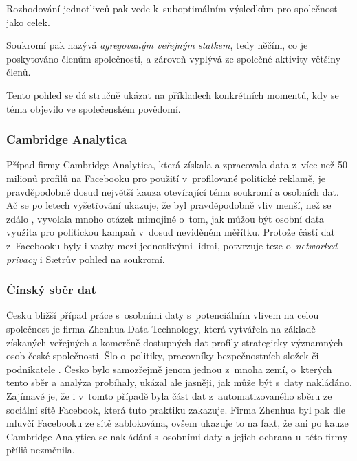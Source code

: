 \begin{displayquote}
	\citep{privacy-as-aggregate-public-good}
\end{displayquote}

Rozhodování jednotlivců pak vede k~suboptimálním výsledkům pro společnost jako celek.

Soukromí pak nazývá \textit{agregovaným veřejným statkem}, tedy něčím, co je poskytováno členům společnosti, a zároveň vyplývá ze společné aktivity většiny členů.

Tento pohled se dá stručně ukázat na příkladech konkrétních momentů, kdy se téma objevilo ve společenském povědomí.

\subsubsection*{Cambridge Analytica}
Případ firmy Cambridge Analytica, která získala a zpracovala data z~více než 50 milionů profilů na Facebooku \citep{cambridge-analytica} pro použití v~profilované politické reklamě, je pravděpodobně dosud největší kauza otevírající téma soukromí a osobních dat. Ač se po letech vyšetřování ukazuje, že byl pravděpodobně vliv menší, než se zdálo \citep{ca-brexit, ca-elections}, vyvolala mnoho otázek mimojiné o~tom, jak můžou být osobní data využita pro politickou kampaň v~dosud neviděném měřítku. Protože částí dat z~Facebooku byly i vazby mezi jednotlivými lidmi, potvrzuje teze o~\textit{networked privacy} i Sætrův pohled na soukromí.

\subsubsection*{Čínský sběr dat}
Česku bližší případ práce s~osobními daty s~potenciálním vlivem na celou společnost je firma Zhenhua Data Technology, která vytvářela na základě získaných veřejných a komerčně dostupných dat profily strategicky významných osob české společnosti. Šlo o~politiky, pracovníky bezpečnostních složek či podnikatele \citep{china-czech}. Česko bylo samozřejmě jenom jednou z~mnoha zemí, o~kterých tento sběr a analýza probíhaly, ukázal ale jasněji, jak může být s~daty nakládáno.
Zajímavé je, že i v~tomto případě byla část dat z~automatizovaného sběru ze sociální sítě Facebook, která tuto praktiku zakazuje. Firma Zhenhua byl pak dle mluvčí Facebooku ze sítě zablokována, ovšem ukazuje to na fakt, že ani po kauze Cambridge Analytica se nakládání s~osobními daty a jejich ochrana u~této firmy příliš nezměnila.

